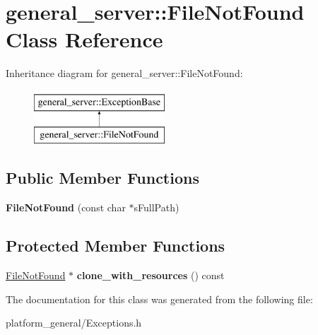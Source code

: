 \hypertarget{classgeneral__server_1_1FileNotFound}{\section{general\-\_\-server\-:\-:\-File\-Not\-Found \-Class \-Reference}
\label{classgeneral__server_1_1FileNotFound}
}
\-Inheritance diagram for general\-\_\-server\-:\-:\-File\-Not\-Found\-:\begin{figure}[H]
\begin{center}
\leavevmode
\includegraphics[height=2.000000cm]{classgeneral__server_1_1FileNotFound}
\end{center}
\end{figure}
\subsection*{\-Public \-Member \-Functions}
\begin{DoxyCompactItemize}
\item 
\hypertarget{classgeneral__server_1_1FileNotFound_ab2e6b14eacc5275da0e7b85d6d138f47}{{\bfseries \-File\-Not\-Found} (const char $\ast$s\-Full\-Path)}\label{classgeneral__server_1_1FileNotFound_ab2e6b14eacc5275da0e7b85d6d138f47}

\end{DoxyCompactItemize}
\subsection*{\-Protected \-Member \-Functions}
\begin{DoxyCompactItemize}
\item 
\hypertarget{classgeneral__server_1_1FileNotFound_a21ab27b8d6f68626cdf01bb367fe3c86}{\hyperlink{classgeneral__server_1_1FileNotFound}{\-File\-Not\-Found} $\ast$ {\bfseries clone\-\_\-with\-\_\-resources} () const }\label{classgeneral__server_1_1FileNotFound_a21ab27b8d6f68626cdf01bb367fe3c86}

\end{DoxyCompactItemize}


\-The documentation for this class was generated from the following file\-:\begin{DoxyCompactItemize}
\item 
platform\-\_\-general/\-Exceptions.\-h\end{DoxyCompactItemize}
